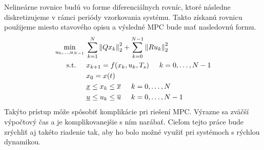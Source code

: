 Nelineárne rovnice budú vo forme diferenciálnych rovníc, ktoré následne diskretizujeme v rámci periódy vzorkovania systému. Takto získanú rovnicu použijeme miesto stavového opisu a výsledné MPC bude mať nasledovnú formu.
\begin{subequations}
	\begin{align}
	\displaystyle \min_{u_0,...,u_{N-1}} \hspace{0.1cm} & 
	\sum_{k=1}^{N}\left\lVert Qx_k\right\rVert^{2}_{2}+\sum_{k=0}^{N-1}\left\lVert Ru_k\right\rVert^{2}_{2}\\
	\textrm{s.t.} \hspace{0.5cm} & x_{k+1} = f(x_{k},u_{k},T_{s})\hspace{0.5cm} k=0,\dots,N-1\\
	& x_{0} = x(t)\\
	& \underline{x} \leq x_{k} \leq \overline{x}\hspace{0.5cm} k=0,\dots,N\\
	& \underline{u} \leq u_{k} \leq \overline{u}\hspace{0.5cm} k=0,\dots,N-1
	\end{align}
\end{subequations}
Takýto prístup môže spôsobiť komplikácie pri riešení MPC. Výrazne sa zväčší výpočtový čas a je komplikovanejšie s ním narábať. Cieľom tejto práce bude zrýchliť aj takéto riadenie tak, aby ho bolo možné využiť pri systémoch s rýchlou dynamikou.
